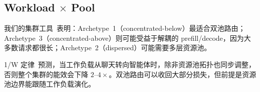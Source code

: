 \subsection{Workload $\times$ Pool}
\label{sec:cross:wp}

\begin{observation}[工作负载原型决定最优拓扑]
\label{obs:wp-topo}
我们的集群工具~\cite{fleetopt2026, fleetsim2026}表明：Archetype~1（concentrated-below）最适合双池路由；Archetype~3（concentrated-above）则可能受益于解耦的 prefill/decode，因为大多数请求都很长；Archetype~2（dispersed）可能需要多层资源池。
\end{observation}

\begin{observation}[智能体普及会推动能效前沿变化]
\label{obs:wp-energy}
1/W 定律~\cite{onewlaw2026}预测，当工作负载从聊天转向智能体时，除非资源池拓扑也同步调整，否则整个集群的能效会下降 $2$--$4\times$。双池路由可以收回大部分损失，但前提是资源池边界能跟随工作负载演化。
\end{observation}
